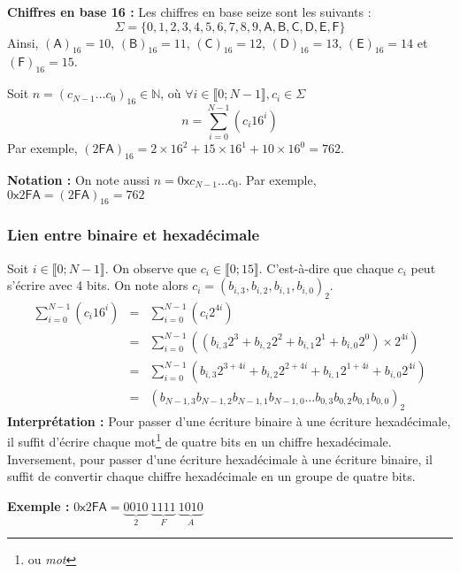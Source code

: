 \documentclass[../../main.tex]{subfiles}
\begin{document}
\textbf{Chiffres en base 16 :} Les chiffres en base seize sont les suivants :
$$\Sigma = \{0, 1, 2, 3, 4, 5, 6, 7, 8, 9, \textsf{A}, \textsf{B}, \textsf{C}, \textsf{D}, \textsf{E}, \textsf{F}\}$$
Ainsi, $(\textsf{A})_{16} = 10$, $(\textsf{B})_{16} = 11$, $(\textsf{C})_{16} = 12$, $(\textsf{D})_{16} = 13$, $(\textsf{E})_{16} = 14$ et $(\textsf{F})_{16} = 15$.

Soit $n = (c_{N-1}\dots c_{0})_{16}\in{\mathbb{N}}$, où $\forall{i\in{\llbracket0; N-1\rrbracket}}, c_{i}\in{\Sigma}$
$$n = \displaystyle\sum_{i = 0}^{N-1}\left(c_{i}16^{i}\right)$$ 
Par exemple, $(2\textsf{FA})_{16} = 2\times{16^{2}} + 15\times{16^{1}} + 10\times{16^{0}} = 762$.

\textbf{Notation :} On note aussi $n = 0\textsf{x}c_{N-1}\dots c_{0}$. Par exemple, $0\textsf{x}2\textsf{FA} = (2\textsf{FA})_{16} = 762$

\subsubsection{Lien entre binaire et hexadécimale}

Soit $i\in{\llbracket 0; N-1\rrbracket}$. On observe que $c_{i}\in{\llbracket 0; 15\rrbracket}$. C'est-à-dire que chaque $c_{i}$ peut s'écrire avec 4 bits. On note alors $c_{i} = (b_{i, 3}, b_{i, 2}, b_{i, 1}, b_{i, 0})_{2}$.
$$
\begin{array}{lcl}
\displaystyle\sum_{i = 0}^{N-1}\left(c_{i}16^{i}\right) & = & \displaystyle\sum_{i = 0}^{N-1}\left(c_{i}2^{4i}\right) \\
 & = & \displaystyle\sum_{i = 0}^{N-1}\left((b_{i, 3}2^{3} + b_{i, 2}2^{2} + b_{i, 1}2^{1} + b_{i, 0}2^{0})\times2^{4i}\right) \\
 & = & \displaystyle\sum_{i = 0}^{N-1}\left(b_{i, 3}2^{3 + 4i} + b_{i, 2}2^{2 + 4i} + b_{i, 1}2^{1 + 4i} + b_{i, 0}2^{4i}\right) \\
 & = & (b_{N-1, 3}b_{N-1, 2}b_{N-1, 1}b_{N-1, 0}\dots b_{0, 3}b_{0, 2}b_{0, 1}b_{0, 0})_{2}
\end{array}
$$
\textbf{Interprétation :} Pour passer d'une écriture binaire à une écriture hexadécimale, il suffit d'écrire chaque mot\footnote{ou \textit{mot}} de quatre bits en un chiffre hexadécimale. Inversement, pour passer d'une écriture hexadécimale à une écriture binaire, il suffit de convertir chaque chiffre hexadécimale en un groupe de quatre bits.

\textbf{Exemple :}  $0\textsf{x}2\textsf{FA} = \underbrace{0010}_{2}\ \underbrace{1111}_{F}\ \underbrace{1010}_{A}$
\end{document}
